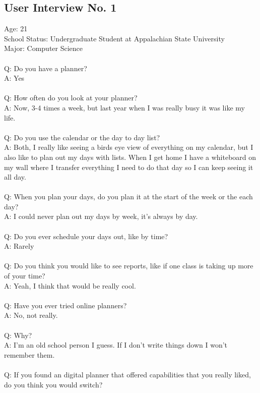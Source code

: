 %
%
\subsection{User Interview No. 1}
Age: 21\\
School Status: Undergraduate Student at Appalachian State University \\
Major: Computer Science\\ \\
Q: Do you have a planner?\\
A: Yes \\ \\
Q: How often do you look at your planner?\\
A: Now, 3-4 times a week, but last year when I was really busy it was like my life.\\ \\
Q: Do you use the calendar or the day to day list?\\
A: Both, I really like seeing a birds eye view of everything on my calendar, but I also like to plan out my days with lists. When I get home I have a whiteboard on my wall where I transfer everything I need to do that day so I can keep seeing it all day.\\ \\
Q: When you plan your days, do you plan it at the start of the week or the each day?\\
A: I could never plan out my days by week, it’s always by day.\\ \\
Q: Do you ever schedule your days out, like by time?\\
A: Rarely \\ \\
Q: Do you think you would like to see reports, like if one class is taking up more of your time?\\
A: Yeah, I think that would be really cool.\\ \\
Q: Have you ever tried online planners? \\
A: No, not really.\\ \\
Q: Why?\\
A: I'm an old school person I guess. If I don't write things down I won't remember them.\\ \\
Q: If you found an digital planner that offered capabilities that you really liked, do you think you would switch?\\
